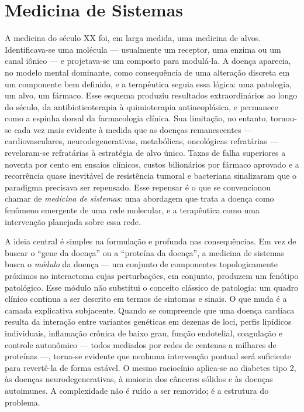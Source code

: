 \chapter{Medicina de Sistemas}
\label{cap:13}

\normalfont\rmfamily\upshape
A medicina do século XX foi, em larga medida, uma medicina de alvos. Identificava-se uma molécula --- usualmente um receptor, uma enzima ou um canal iônico --- e projetava-se um composto para modulá-la. A doença aparecia, no modelo mental dominante, como consequência de uma alteração discreta em um componente bem definido, e a terapêutica seguia essa lógica: uma patologia, um alvo, um fármaco. Esse esquema produziu resultados extraordinários ao longo do século, da antibioticoterapia à quimioterapia antineoplásica, e permanece como a espinha dorsal da farmacologia clínica. Sua limitação, no entanto, tornou-se cada vez mais evidente à medida que as doenças remanescentes --- cardiovasculares, neurodegenerativas, metabólicas, oncológicas refratárias --- revelaram-se refratárias à estratégia de alvo único. Taxas de falha superiores a noventa por cento em ensaios clínicos, custos bilionários por fármaco aprovado e a recorrência quase inevitável de resistência tumoral e bacteriana sinalizaram que o paradigma precisava ser repensado. Esse repensar é o que se convencionou chamar de \emph{medicina de sistemas}: uma abordagem que trata a doença como fenômeno emergente de uma rede molecular, e a terapêutica como uma intervenção planejada sobre essa rede.

A ideia central é simples na formulação e profunda nas consequências. Em vez de buscar o ``gene da doença'' ou a ``proteína da doença'', a medicina de sistemas busca o \emph{módulo} da doença --- um conjunto de componentes topologicamente próximos no interactoma cujas perturbações, em conjunto, produzem um fenótipo patológico. Esse módulo não substitui o conceito clássico de patologia: um quadro clínico continua a ser descrito em termos de sintomas e sinais. O que muda é a camada explicativa subjacente. Quando se compreende que uma doença cardíaca resulta da interação entre variantes genéticas em dezenas de loci, perfis lipídicos individuais, inflamação crônica de baixo grau, função endotelial, coagulação e controle autonômico --- todos mediados por redes de centenas a milhares de proteínas ---, torna-se evidente que nenhuma intervenção pontual será suficiente para revertê-la de forma estável. O mesmo raciocínio aplica-se ao diabetes tipo 2, às doenças neurodegenerativas, à maioria dos cânceres sólidos e às doenças autoimunes. A complexidade não é ruído a ser removido; é a estrutura do problema.


